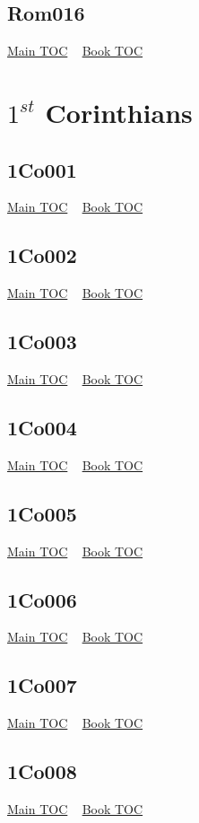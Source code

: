 \documentclass{book}
\begin{document}
  \section{Rom016}\hyperlink{toc}{Main TOC} ~ \hyperref[subsec:Rom]{Book TOC} 
  \chapter{$1^{st}$ Corinthians} \label{subsec:1Co} \begin{multicols}{2} \minitoc \end{multicols}
  \section{1Co001}\hyperlink{toc}{Main TOC} ~ \hyperref[subsec:1Co]{Book TOC} 
  \section{1Co002}\hyperlink{toc}{Main TOC} ~ \hyperref[subsec:1Co]{Book TOC} 
  \section{1Co003}\hyperlink{toc}{Main TOC} ~ \hyperref[subsec:1Co]{Book TOC} 
  \section{1Co004}\hyperlink{toc}{Main TOC} ~ \hyperref[subsec:1Co]{Book TOC} 
  \section{1Co005}\hyperlink{toc}{Main TOC} ~ \hyperref[subsec:1Co]{Book TOC} 
  \section{1Co006}\hyperlink{toc}{Main TOC} ~ \hyperref[subsec:1Co]{Book TOC} 
  \section{1Co007}\hyperlink{toc}{Main TOC} ~ \hyperref[subsec:1Co]{Book TOC} 
  \section{1Co008}\hyperlink{toc}{Main TOC} ~ \hyperref[subsec:1Co]{Book TOC} 
\end{document}
